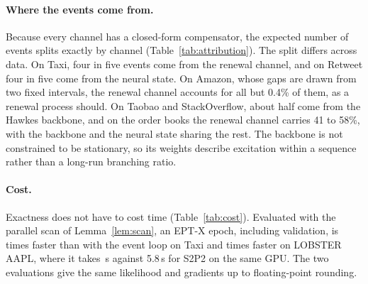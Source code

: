 \begin{table}[!htbp]\centering\footnotesize
\caption{EPT-X ablations: validation log-likelihood per event (higher is better). The EPT and
EPT-X rows are the final runs (mean $\pm$ s.d.\ over seeds); each variant is one seed. Encoder and
atom variants use a 100-epoch budget. The last three rows add one new component each, with the
final budget on Taxi, Taobao and StackOverflow and 100 epochs on Amazon and INTC, where they are
added to the sharp-atom configuration. Bold: best; underlined: second best.}\label{tab:ablation}
\setlength{\tabcolsep}{4pt}

\end{table}

\paragraph{Where the events come from.} Because every channel has a closed-form compensator, the
expected number of events splits exactly by channel (Table~\ref{tab:attribution}). The split differs
across data. On Taxi, four in five events come from the renewal channel, and on Retweet four in five
come from the neural state. On Amazon, whose gaps are drawn from two fixed intervals, the renewal
channel accounts for all but 0.4\% of them, as a renewal process should. On Taobao and StackOverflow, about half come from the Hawkes backbone,
and on the order books the renewal channel carries 41 to 58\%, with the backbone and the neural state
sharing the rest. The backbone is not constrained to be stationary, so its weights
describe excitation within a sequence rather than a long-run branching ratio.

\begin{table}[!htbp]\centering\small
\caption{Exact share (\%) of the expected number of test events contributed by each channel of the
selected EPT-X model (seed 0).}\label{tab:attribution}

\end{table}

\paragraph{Cost.} Exactness does not have to cost time (Table~\ref{tab:cost}). Evaluated with the
parallel scan of Lemma~\ref{lem:scan}, an EPT-X epoch, including validation, is \scanSpeedTaxi{}
times faster than with the event loop on Taxi and \scanSpeedAAPL{} times faster on LOBSTER AAPL,
where it takes \scanSecAAPL{}\,s against 5.8\,s for S2P2 on the same GPU. The two evaluations give
the same likelihood and gradients up to floating-point rounding.

